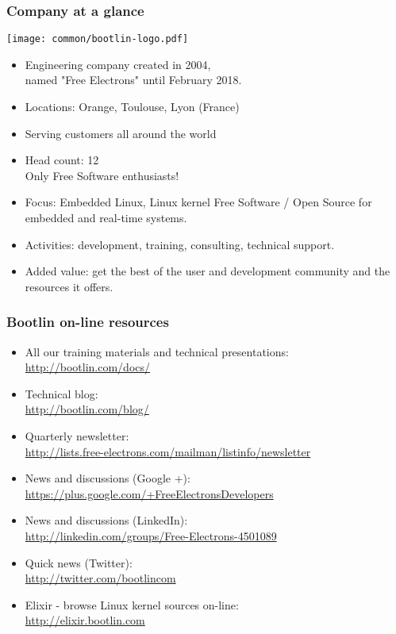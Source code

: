 \begin{frame}
\frametitle{Company at a glance}
  \texttt{[image: common/bootlin-logo.pdf]}
  \begin{itemize}
    \item Engineering company created in 2004,\\
          named "Free Electrons" until February 2018.
    \item Locations: Orange, Toulouse, Lyon (France)
    \item Serving customers all around the world
    \item Head count: 12 \\
	  Only Free Software enthusiasts!
    \item Focus: Embedded Linux, Linux kernel
          Free Software / Open Source
          for embedded and real-time systems.
    \item Activities: development, training, consulting, technical
          support.
    \item Added value: get the best of the user and development
          community and the resources it offers.
  \end{itemize}
\end{frame}

\begin{frame}
\frametitle{Bootlin on-line resources}
  \begin{itemize}
    \item All our training materials and technical presentations:\\
          \url{http://bootlin.com/docs/}
    \item Technical blog:\\
          \url{http://bootlin.com/blog/}
    \item Quarterly newsletter:\\
 	  \url{http://lists.free-electrons.com/mailman/listinfo/newsletter}
    \item News and discussions (Google +):\\
	  \url{https://plus.google.com/+FreeElectronsDevelopers}
    \item News and discussions (LinkedIn):\\
	  \url{http://linkedin.com/groups/Free-Electrons-4501089}
    \item Quick news (Twitter):\\
          \url{http://twitter.com/bootlincom}
    \item Elixir - browse Linux kernel sources on-line:\\
          \url{http://elixir.bootlin.com}
  \end{itemize}
\end{frame}

